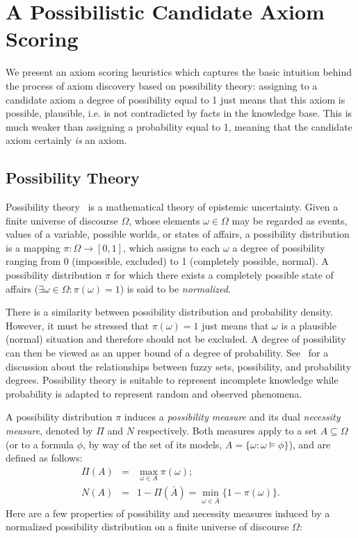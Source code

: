 \documentclass{sig-alternate}
\begin{document}
\section{A Possibilistic Candidate Axiom Scoring}
\label{possibility-theory}

We present an axiom scoring heuristics which captures the basic intuition
behind the process of axiom discovery based on possibility theory: assigning to a candidate axiom a degree of possibility equal to 1 just means that this axiom is possible, plausible, i.e. is not contradicted by facts in the knowledge base. This is  much weaker than assigning a probability equal to 1, meaning that the candidate axiom certainly \textit{is} an axiom.

\subsection{Possibility Theory}

Possibility theory~\cite{Zadeh1978} is a mathematical theory of epistemic uncertainty.
Given a finite universe of discourse $\Omega$, whose elements $\omega\in\Omega$
may be regarded as events, values of a variable, possible worlds, or states of affairs,
a possibility distribution is a mapping $\pi: \Omega \to [0, 1]$,
which assigns to each $\omega$ a degree of possibility ranging from 0 (impossible,
excluded) to 1 (completely possible, normal).
A possibility distribution $\pi$ for  which there exists a completely possible state of
affairs ($\exists \omega \in \Omega: \pi(\omega) = 1$) is said to be \emph{normalized}.

There is a similarity between possibility distribution and probability 
density. However, it must be stressed that $\pi(\omega) = 1$ just means that
$\omega$ is a plausible (normal) situation and therefore should not be excluded.
A degree of possibility can then be viewed as an upper bound of a degree of probability.
See~\cite{dubois1991} for a discussion
about the relationships between fuzzy sets, possibility, and probability 
degrees.
Possibility theory is suitable to represent incomplete knowledge while 
probability is adapted to represent random and observed phenomena. 


A possibility distribution $\pi$ induces a \emph{possibility
measure} and its dual \emph{necessity
measure}, denoted by $\Pi$ and $N$
respectively. Both measures apply to a set $A \subseteq\Omega$ (or to a
formula $\phi$, by way of the set of its models, $A = \{\omega : \omega \models \phi\}$),
and are defined as follows:
\begin{eqnarray}
  \Pi(A) &=& \max_{\omega\in A} \pi(\omega); \\
  N(A)   &=& 1 - \Pi(\bar{A}) = \min_{\omega\in \bar{A}} \{1 - \pi(\omega)\}.
\end{eqnarray}
%
Here are a few properties of possibility and necessity measures 
induced by a normalized possibility distribution on a finite universe of
discourse $\Omega$: 
\end{document}

